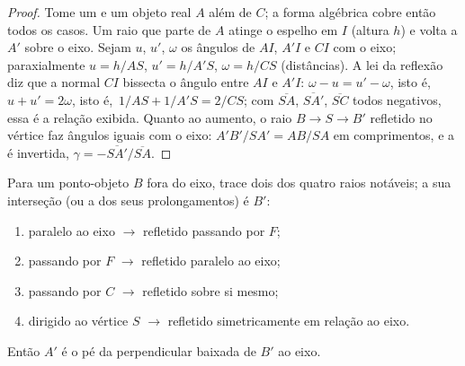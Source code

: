\begin{proof}
Tome um  e um objeto real $A$ além de $C$; a forma
algébrica cobre então todos os casos. Um raio que parte de $A$ atinge o espelho em $I$
(altura $h$) e volta a $A'$ sobre o eixo. Sejam $u$, $u'$, $\omega$
os ângulos de $AI$, $A'I$ e $CI$ com o eixo; paraxialmente
$u = h/AS$, $u' = h/A'S$, $\omega = h/CS$ (distâncias). A lei da
reflexão diz que a normal $CI$ bissecta o ângulo entre $AI$ e
$A'I$: $\omega - u = u' - \omega$, isto é,\ $u + u' = 2\omega$, isto é,\
$1/AS + 1/A'S = 2/CS$; com $\overline{SA}$, $\overline{SA'}$,
$\overline{SC}$ todos negativos, essa é a relação exibida. Quanto ao
aumento, o raio $B \to S \to B'$ refletido no vértice faz
ângulos iguais com o eixo: $A'B'/SA' = AB/SA$ em comprimentos, e a 
é invertida, $\gamma = -\overline{SA'}/\overline{SA}$.
\end{proof}

\begin{method}\label{met:b1:mirrors-thin-lenses:mirrorrays}
Para um ponto-objeto $B$ fora do eixo, trace dois dos quatro raios notáveis;
a sua interseção (ou a dos seus prolongamentos) é $B'$:
\begin{enumerate}
  \item paralelo ao eixo $\to$ refletido passando por $F$;
  \item passando por $F$ $\to$ refletido paralelo ao eixo;
  \item passando por $C$ $\to$ refletido sobre si mesmo;
  \item dirigido ao vértice $S$ $\to$ refletido simetricamente em relação ao eixo.
\end{enumerate}
Então $A'$ é o pé da perpendicular baixada de $B'$ ao eixo.
\end{method}

